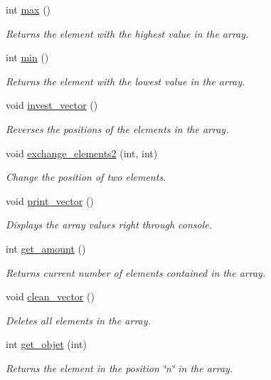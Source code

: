 \begin{DoxyCompactItemize}
int \hyperlink{classarray_aae5279d424036f187c6aa516bbd83c5c}{max} ()
\begin{DoxyCompactList}\small\item\em Returns the element with the highest value in the array. \end{DoxyCompactList}\item 
int \hyperlink{classarray_a9787f152f19d3efaa10661fd8ab5d984}{min} ()
\begin{DoxyCompactList}\small\item\em Returns the element with the lowest value in the array. \end{DoxyCompactList}\item 
void \hyperlink{classarray_ac3d618d2d45fc6734b870e69175191a5}{invest\-\_\-vector} ()
\begin{DoxyCompactList}\small\item\em Reverses the positions of the elements ​​in the array. \end{DoxyCompactList}\item 
void \hyperlink{classarray_a38eae774a7eba29581bf399f33309ffc}{exchange\-\_\-elements2} (int, int)
\begin{DoxyCompactList}\small\item\em Change the position of two elements. \end{DoxyCompactList}\item 
void \hyperlink{classarray_a6fc40f0a530525bb91835af4dcd20565}{print\-\_\-vector} ()
\begin{DoxyCompactList}\small\item\em Displays the array values right through console. \end{DoxyCompactList}\item 
int \hyperlink{classarray_a1e2e2da0c5c43d2a2c6f932036868d38}{get\-\_\-amount} ()
\begin{DoxyCompactList}\small\item\em Returns current number of elements contained in the array. \end{DoxyCompactList}\item 
void \hyperlink{classarray_a22cb040428decbd6b5b4d4be8c03cfd0}{clean\-\_\-vector} ()
\begin{DoxyCompactList}\small\item\em Deletes all elements in the array. \end{DoxyCompactList}\item 
int \hyperlink{classarray_a427fb838f6e374a9ea4ef0e7b44d93dd}{get\-\_\-objet} (int)
\begin{DoxyCompactList}\small\item\em Returns the element in the position \char`\"{}n\char`\"{} in the array. \end{DoxyCompactList}\item 

\end{DoxyCompactItemize}
